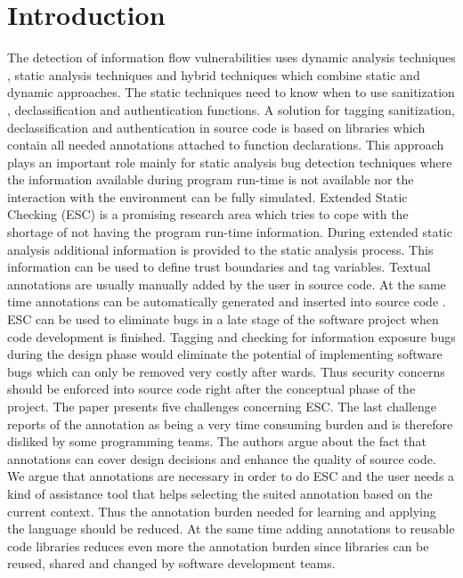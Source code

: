 \chapter{Introduction}
\label{chapter:Introduction}

The detection of information flow vulnerabilities uses dynamic analysis techniques , static analysis techniques and hybrid techniques which combine static and dynamic approaches. The static techniques need to know when to use  sanitization , declassification and authentication functions.
A solution for tagging sanitization, declassification and authentication in source code is based on libraries which contain all needed annotations attached to function declarations. This approach plays an important role mainly for static analysis bug detection techniques where the information available during program run-time is not available nor the interaction with the environment can be fully simulated.
Extended Static Checking (ESC) is a promising research area which tries to cope with the shortage of not having the program run-time information. During extended static analysis additional information is provided to the static analysis process. This information can be used to define trust boundaries and tag variables. Textual annotations are usually manually added by the user in source code. At the same time annotations can be automatically generated and inserted into source code . ESC can be used to eliminate bugs in a late stage of the software project when code development is finished. Tagging and checking for information exposure bugs during the design phase would eliminate the potential of implementing software bugs which can only be removed very costly after wards. Thus security concerns should be enforced into source code right after the conceptual phase of the project.
The paper presents five challenges concerning ESC. The last challenge reports of the annotation as being a very time consuming burden and is therefore disliked by some programming
teams. The authors argue about the fact that annotations can cover design decisions and enhance the quality of source code. We argue that annotations are necessary in order to do ESC and the user needs a kind of assistance tool that helps selecting the suited annotation based on the current context. Thus the annotation burden needed for learning and applying the language should be reduced. At the same time adding annotations to reusable code libraries reduces even more the annotation burden since libraries can be reused, shared and changed by software development
teams.\\

